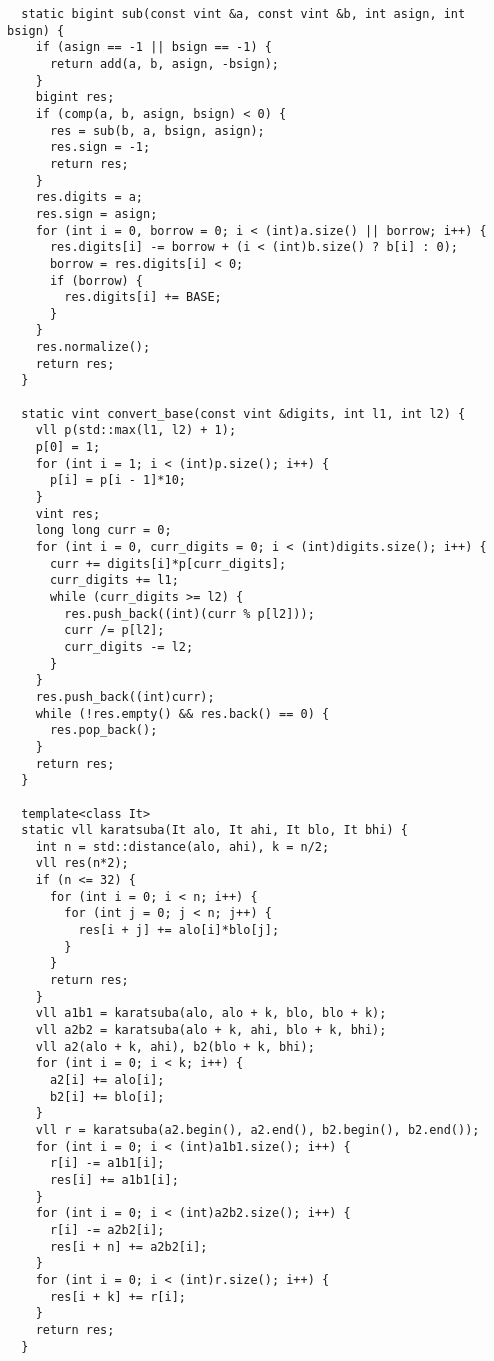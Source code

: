 \begin{lstlisting}
  static bigint sub(const vint &a, const vint &b, int asign, int bsign) {
    if (asign == -1 || bsign == -1) {
      return add(a, b, asign, -bsign);
    }
    bigint res;
    if (comp(a, b, asign, bsign) < 0) {
      res = sub(b, a, bsign, asign);
      res.sign = -1;
      return res;
    }
    res.digits = a;
    res.sign = asign;
    for (int i = 0, borrow = 0; i < (int)a.size() || borrow; i++) {
      res.digits[i] -= borrow + (i < (int)b.size() ? b[i] : 0);
      borrow = res.digits[i] < 0;
      if (borrow) {
        res.digits[i] += BASE;
      }
    }
    res.normalize();
    return res;
  }

  static vint convert_base(const vint &digits, int l1, int l2) {
    vll p(std::max(l1, l2) + 1);
    p[0] = 1;
    for (int i = 1; i < (int)p.size(); i++) {
      p[i] = p[i - 1]*10;
    }
    vint res;
    long long curr = 0;
    for (int i = 0, curr_digits = 0; i < (int)digits.size(); i++) {
      curr += digits[i]*p[curr_digits];
      curr_digits += l1;
      while (curr_digits >= l2) {
        res.push_back((int)(curr % p[l2]));
        curr /= p[l2];
        curr_digits -= l2;
      }
    }
    res.push_back((int)curr);
    while (!res.empty() && res.back() == 0) {
      res.pop_back();
    }
    return res;
  }

  template<class It>
  static vll karatsuba(It alo, It ahi, It blo, It bhi) {
    int n = std::distance(alo, ahi), k = n/2;
    vll res(n*2);
    if (n <= 32) {
      for (int i = 0; i < n; i++) {
        for (int j = 0; j < n; j++) {
          res[i + j] += alo[i]*blo[j];
        }
      }
      return res;
    }
    vll a1b1 = karatsuba(alo, alo + k, blo, blo + k);
    vll a2b2 = karatsuba(alo + k, ahi, blo + k, bhi);
    vll a2(alo + k, ahi), b2(blo + k, bhi);
    for (int i = 0; i < k; i++) {
      a2[i] += alo[i];
      b2[i] += blo[i];
    }
    vll r = karatsuba(a2.begin(), a2.end(), b2.begin(), b2.end());
    for (int i = 0; i < (int)a1b1.size(); i++) {
      r[i] -= a1b1[i];
      res[i] += a1b1[i];
    }
    for (int i = 0; i < (int)a2b2.size(); i++) {
      r[i] -= a2b2[i];
      res[i + n] += a2b2[i];
    }
    for (int i = 0; i < (int)r.size(); i++) {
      res[i + k] += r[i];
    }
    return res;
  }


\end{lstlisting}

